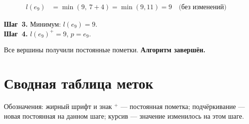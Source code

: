 \documentclass[a4paper,12pt]{article}
\begin{document}
\begin{align*}
	l(e_9) & = \min(9,\ 7+4) = \min(9,11) = 9 \quad \text{(без изменений)}
\end{align*}

\textbf{Шаг~3.} Минимум: $l(e_9) = 9$.\\
\textbf{Шаг~4.} $l(e_9)^+ = 9$, $p = e_9$.

Все вершины получили постоянные пометки. \textbf{Алгоритм завершён.}

\newpage
\section*{Сводная таблица меток}

Обозначения: жирный шрифт и знак $^+$ — постоянная пометка; подчёркивание — новая постоянная на данном шаге; курсив — значение изменилось на этом шаге.
\end{document}
